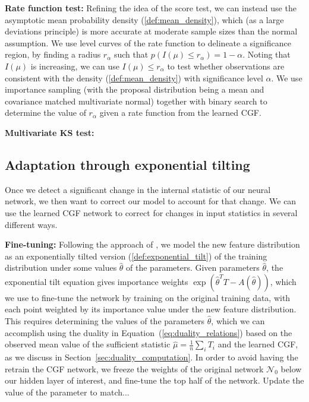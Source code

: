\documentclass[11pt]{article}      %
\begin{document}
\noindent \textbf{Rate function test:} Refining the idea of the score test, we can instead use the asymptotic mean probability density (\ref{def:mean_density}), which (as a large deviations principle) is more accurate at moderate sample sizes than the normal assumption.
We use level curves of the rate function to delineate a significance region, by finding a radius $r_\alpha$ such that $p(I(\mu) \le r_\alpha) = 1 - \alpha$.
Noting that $I(\mu)$ is increasing, we can use $I(\mu) \le r_\alpha$ to test whether observations are consistent with the density (\ref{def:mean_density}) with significance level $\alpha$.
We use importance sampling (with the proposal distribution being a mean and covariance matched multivariate normal) together with binary search to determine the value of $r_\alpha$ given a rate function from the learned CGF.


\noindent \textbf{Multivariate KS test:}








\newpage
\subsection{Adaptation through exponential tilting}
Once we detect a significant change in the internal statistic of our neural network, we then want to correct our model to account for that change.
We can use the learned CGF network to correct for changes in input statistics in several different ways.

\noindent \textbf{Fine-tuning:} Following the approach of \cite{maity_understanding_2023}, we model the new feature distribution as an exponentially tilted version (\ref{def:exponential_tilt}) of the training distribution  under some values $\hat \theta$ of the parameters.
Given parameters $\hat \theta$, the exponential tilt equation gives importance weights ${\exp(\hat \theta^T T - A(\hat \theta))}$, which we use to fine-tune the network by training on the original training data, with each point weighted by its importance value under the new feature distribution.
This requires determining the values of the parameters $\hat \theta$, which we can accomplish using the duality in Equation~(\ref{eq:duality_relations}) based on the observed mean value of the sufficient statistic ${\hat \mu = \frac{1}{n} \sum_i T_i}$ and the learned CGF, as we discuss in Section~\ref{sec:duality_computation}.
In order to avoid having the retrain the CGF network, we freeze the weights of the original network $\mathcal{N}_0$ below our hidden layer of interest, and fine-tune the top half of the network.
Update the value of the parameter to match...
\end{document}
